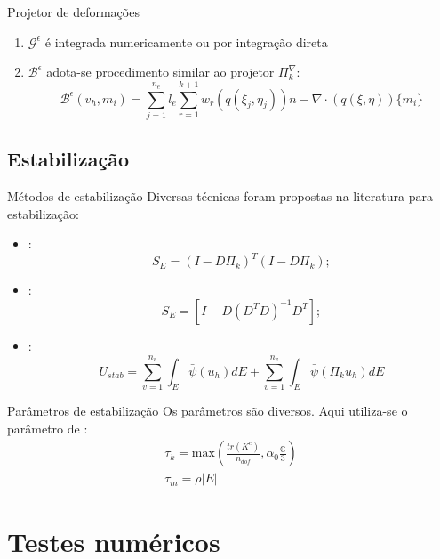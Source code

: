 \documentclass{beamer}
\begin{document}
\begin{frame}{Projetor de deformações}
    \begin{enumerate}
        \item $\mathcal{G}^\epsilon$ é integrada numericamente ou por integração direta
        \item $\mathcal{B}^\epsilon$ adota-se procedimento similar ao projetor $\Pi_k^\nabla$: $$\mathcal{B}^\epsilon(v_h,m_i) = \sum_{j=1}^{n_e} l_e\sum_{r=1}^{k+1} w_r \left(q(\xi_j,\eta_j)\right) n - \nabla \cdot \left(q(\xi,\eta)\right) \{m_i\}$$
    \end{enumerate}
\end{frame}

\subsection{Estabilização}

\begin{frame}{Métodos de estabilização}
    Diversas técnicas foram propostas na literatura para estabilização:
    \begin{itemize}
        \item \cite{basicprinciplesvirtualelementmethods2013a}: $$S_E = (I - D\Pi_k)^T(I - D\Pi_k);$$
        \item \cite{arbitraryorder2dvirtualelementspolygonalmeshespartelasticproblem2017a}: $$S_E = \left[I - D(D^TD)^{-1}D^T \right];$$
        \item \cite{wriggers2017efficient}: $$U_{stab} = \sum_{v=1}^{n_v}\int_E \bar{\psi}(u_h)dE + \sum_{v=1}^{n_v}\int_E \bar{\psi}(\Pi_k u_h)dE$$
    \end{itemize}    
\end{frame}

\begin{frame}{Parâmetros de estabilização}
    Os parâmetros são diversos. Aqui utiliza-se o parâmetro de \cite{numericalrecipeselastodynamicvirtualelementmethodsexplicittimeintegration2020}: $$\begin{aligned}
        \tau_k = \text{max}\left(\frac{tr(K^{c})}{n_{dof}}, \alpha_0 \frac{\mathbb{C}}{3}\right)\\
        \tau_m = \rho |E|
    \end{aligned}$$
\end{frame}

\section{Testes numéricos}
\end{document}
